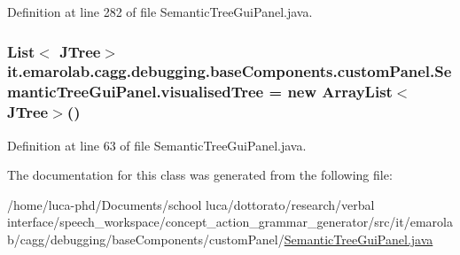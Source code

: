 Definition at line 282 of file Semantic\-Tree\-Gui\-Panel.\-java.

\hypertarget{classit_1_1emarolab_1_1cagg_1_1debugging_1_1baseComponents_1_1customPanel_1_1SemanticTreeGuiPanel_ae867ddf7fcdc92008227b18b8b208719}{
\subsubsection[{visualised\-Tree}]{\setlength{\rightskip}{0pt plus 5cm}List$<$ J\-Tree$>$ it.\-emarolab.\-cagg.\-debugging.\-base\-Components.\-custom\-Panel.\-Semantic\-Tree\-Gui\-Panel.\-visualised\-Tree = new Array\-List$<$ J\-Tree$>$()\hspace{0.3cm}{\ttfamily [private]}}}\label{classit_1_1emarolab_1_1cagg_1_1debugging_1_1baseComponents_1_1customPanel_1_1SemanticTreeGuiPanel_ae867ddf7fcdc92008227b18b8b208719}


Definition at line 63 of file Semantic\-Tree\-Gui\-Panel.\-java.



The documentation for this class was generated from the following file\-:\begin{DoxyCompactItemize}
\item 
/home/luca-\/phd/\-Documents/school luca/dottorato/research/verbal interface/speech\-\_\-workspace/concept\-\_\-action\-\_\-grammar\-\_\-generator/src/it/emarolab/cagg/debugging/base\-Components/custom\-Panel/\hyperlink{SemanticTreeGuiPanel_8java}{Semantic\-Tree\-Gui\-Panel.\-java}\end{DoxyCompactItemize}
